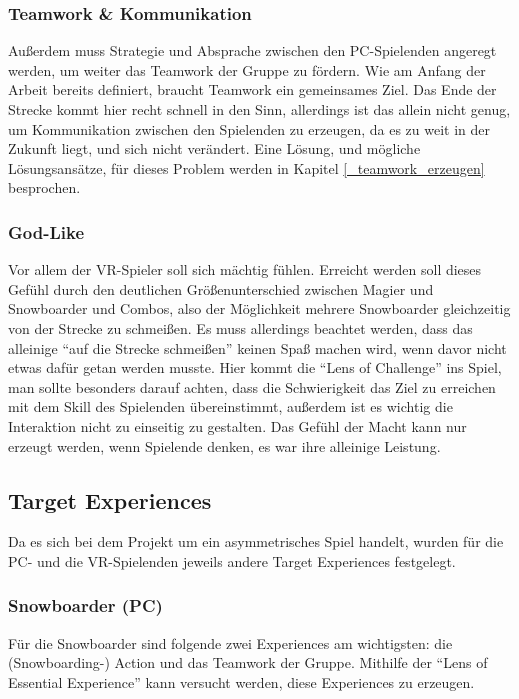 \subsubsection{Teamwork \& Kommunikation}
Außerdem muss Strategie und Absprache zwischen den PC-Spielenden angeregt werden, um weiter das Teamwork der Gruppe zu fördern. Wie am Anfang der Arbeit bereits definiert, braucht Teamwork ein gemeinsames Ziel. Das Ende der Strecke kommt hier recht schnell in den Sinn, allerdings ist das allein nicht genug, um Kommunikation zwischen den Spielenden zu erzeugen, da es zu weit in der Zukunft liegt, und sich nicht verändert. Eine Lösung, und mögliche Lösungsansätze, für dieses Problem werden in Kapitel \ref{_teamwork_erzeugen} besprochen.

\subsubsection{God-Like}
Vor allem der VR-Spieler soll sich mächtig fühlen. Erreicht werden soll dieses Gefühl durch den deutlichen Größenunterschied zwischen Magier und Snowboarder und Combos, also der Möglichkeit mehrere Snowboarder gleichzeitig von der Strecke zu schmeißen. Es muss allerdings beachtet werden, dass das alleinige "`auf die Strecke schmeißen"' keinen Spaß machen wird, wenn davor nicht etwas dafür getan werden musste. Hier kommt die "`Lens of Challenge"'\cite{_art_of_gamedesign} ins Spiel, man sollte besonders darauf achten, dass die Schwierigkeit das Ziel zu erreichen mit dem Skill des Spielenden übereinstimmt, außerdem ist es wichtig die Interaktion nicht zu einseitig zu gestalten. Das Gefühl der Macht kann nur erzeugt werden, wenn Spielende denken, es war ihre alleinige Leistung.

\subsection{Target Experiences}

Da es sich bei dem Projekt um ein asymmetrisches Spiel handelt, wurden für die PC- und die VR-Spielenden jeweils andere Target Experiences festgelegt.

\subsubsection{Snowboarder (PC)}
Für die Snowboarder sind folgende zwei Experiences am wichtigsten: die (Snowboarding-) Action und das Teamwork der Gruppe. Mithilfe der "`Lens of Essential Experience"'\cite[S. 55]{_art_of_gamedesign} kann versucht werden, diese Experiences zu erzeugen.

